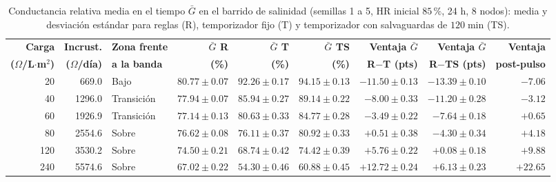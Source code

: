\begin{table}[htbp]
\centering
\footnotesize
\setlength{\tabcolsep}{2pt}
\caption{Conductancia relativa media en el tiempo $\bar{G}$ en el barrido de salinidad (semillas 1 a 5, HR inicial $85\,\%$, 24 h, 8 nodos): media y desviaci\'on est\'andar para reglas (R), temporizador fijo (T) y temporizador con salvaguardas de $120\;\text{min}$ (TS).}
\label{tab:metrica_homogenea}
\begin{tabular*}{\textwidth}{@{\extracolsep{\fill}}rrlrrrrrr@{}}
\toprule
\textbf{Carga} & \textbf{Incrust.} & \textbf{Zona frente} & \textbf{$\bar{G}$ R} & \textbf{$\bar{G}$ T} & \textbf{$\bar{G}$ TS} & \textbf{Ventaja $\bar{G}$} & \textbf{Ventaja $\bar{G}$} & \textbf{Ventaja} \\
\textbf{($\Omega$/L$\cdot$m$^2$)} & \textbf{($\Omega$/d\'ia)} & \textbf{a la banda} & \textbf{(\%)} & \textbf{(\%)} & \textbf{(\%)} & \textbf{R$-$T (pts)} & \textbf{R$-$TS (pts)} & \textbf{post-pulso} \\
\midrule
20 & 669.0 & Bajo & $80.77 \pm 0.07$ & $92.26 \pm 0.17$ & $94.15 \pm 0.13$ & $-11.50 \pm 0.13$ & $-13.39 \pm 0.10$ & $-7.06$ \\
40 & 1296.0 & Transici\'on & $77.94 \pm 0.07$ & $85.94 \pm 0.27$ & $89.14 \pm 0.22$ & $-8.00 \pm 0.33$ & $-11.20 \pm 0.28$ & $-3.12$ \\
60 & 1926.9 & Transici\'on & $77.14 \pm 0.13$ & $80.63 \pm 0.33$ & $84.77 \pm 0.28$ & $-3.49 \pm 0.22$ & $-7.64 \pm 0.18$ & $+0.65$ \\
80 & 2554.6 & Sobre & $76.62 \pm 0.08$ & $76.11 \pm 0.37$ & $80.92 \pm 0.33$ & $+0.51 \pm 0.38$ & $-4.30 \pm 0.34$ & $+4.18$ \\
120 & 3530.2 & Sobre & $74.50 \pm 0.21$ & $68.74 \pm 0.42$ & $74.42 \pm 0.39$ & $+5.76 \pm 0.22$ & $+0.08 \pm 0.18$ & $+9.88$ \\
240 & 5574.6 & Sobre & $67.02 \pm 0.22$ & $54.30 \pm 0.46$ & $60.88 \pm 0.45$ & $+12.72 \pm 0.24$ & $+6.13 \pm 0.23$ & $+22.65$ \\
\bottomrule
\end{tabular*}
\end{table}

